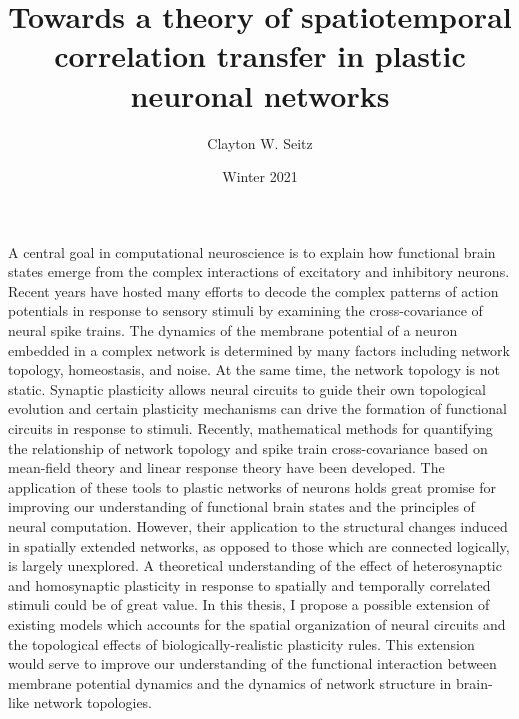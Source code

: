 \documentclass{ucetd}
\title{Towards a theory of spatiotemporal correlation transfer in plastic neuronal networks}
\author{Clayton W. Seitz}
\date{Winter 2021}
\begin{document}
\maketitle

\makecopyright
\makeepigraph


\tableofcontents

\acknowledgments

\abstract

A central goal in computational neuroscience is to explain how functional brain states emerge from the complex interactions of excitatory and inhibitory neurons. Recent years have hosted many efforts to decode the complex patterns of action potentials in response to sensory stimuli by examining the cross-covariance of neural spike trains. The dynamics of the membrane potential of a neuron embedded in a complex network is determined by many factors including network topology, homeostasis, and noise. At the same time, the network topology is not static. Synaptic plasticity allows neural circuits to guide their own topological evolution and certain plasticity mechanisms can drive the formation of functional circuits in response to stimuli. Recently, mathematical methods for quantifying the relationship of network topology and spike train cross-covariance based on mean-field theory and linear response theory have been developed. The application of these tools to plastic networks of neurons holds great promise for improving our understanding of functional brain states and the principles of neural computation. However, their application to the structural changes induced in spatially extended networks, as opposed to those which are connected logically, is largely unexplored. A theoretical understanding of the effect of heterosynaptic and homosynaptic plasticity in response to spatially and temporally correlated stimuli could be of great value. In this thesis, I propose a possible extension of existing models which accounts for the spatial organization of neural circuits and the topological effects of biologically-realistic plasticity rules. This extension would serve to improve our understanding of the functional interaction between membrane potential dynamics and the dynamics of network structure in brain-like network topologies.
\clearpage
\end{document}
